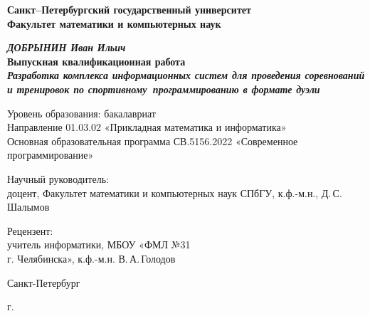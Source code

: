 \begin{titlepage}
\begin{center}

\textbf{Санкт--Петербургский государственный университет}\\
\textbf{Факультет математики и компьютерных наук}


\vspace{35mm}

\textbf{\textit{\large ДОБРЫНИН Иван Ильич}} \\[8mm]
\textbf{\large Выпускная квалификационная работа}\\[3mm]
\textbf{\textit{\large Разработка комплекса информационных систем для проведения соревнований и тренировок по спортивному~программированию в формате дуэли}}

\vspace{20mm}
Уровень образования: бакалавриат\\
Направление 01.03.02 «Прикладная математика и информатика»\\
Основная образовательная программа СВ.5156.2022
«Современное программирование»\\[25mm]


\begin{flushright}
\begin{minipage}[t]{0.65\textwidth}
{Научный руководитель:} \\
доцент, Факультет математики и компьютерных наук СПбГУ, к.ф.-м.н., Д.\,С.\,Шалымов 
\vspace{10mm}

{Рецензент:} \\
учитель информатики, МБОУ «ФМЛ №31 \\ г. Челябинска», к.ф.-м.н. В.\,А.\,Голодов
\end{minipage}
\end{flushright}

\vfill

{Санкт-Петербург}
\par{\the\year{} г.}
\end{center}
\end{titlepage}
\restoregeometry
\addtocounter{page}{1}